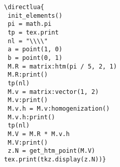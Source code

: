 \vspace{.5 em}
\begin{minipage}{.5\textwidth}
\begin{verbatim}
\directlua{
 init_elements()
 pi = math.pi
 tp = tex.print
 nl = "\\\\"
 a = point(1, 0)
 b = point(0, 1)
 M.R = matrix:htm(pi / 5, 2, 1)
 M.R:print()
 tp(nl)
 M.v = matrix:vector(1, 2)
 M.v:print()
 M.v.h = M.v:homogenization()
 M.v.h:print()
 tp(nl)
 M.V = M.R * M.v.h
 M.V:print()
 z.N = get_htm_point(M.V)
tex.print(tkz.display(z.N))}
\end{verbatim}
\end{minipage}
\begin{minipage}{.5\textwidth}
\end{minipage}
\endinput